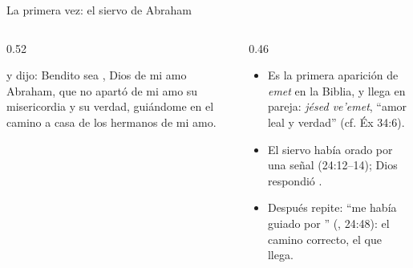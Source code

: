 \begin{frame}{La primera vez: el siervo de Abraham}
\begin{columns}[t,onlytextwidth]
\begin{column}{0.52\textwidth}
\begin{cita}y dijo: Bendito sea \SENOR{}, Dios de mi amo Abraham, que no apartó de mi amo su misericordia y su verdad, guiándome \SENOR{} en el camino a casa de los hermanos de mi amo.\end{cita}
\begin{center}\end{center}
\end{column}
\begin{column}{0.46\textwidth}\small
\begin{itemize}
\item Es la primera aparición de \emph{emet} en la Biblia, y llega en pareja: \emph{jésed ve'emet}, ``amor leal y verdad'' (cf. Éx 34:6).
\item El siervo había orado por una señal (24:12--14); Dios respondió .
\item Después repite: ``me había guiado por '' (, 24:48): el camino correcto, el que llega.
\end{itemize}
\end{column}
\end{columns}
\end{frame}

